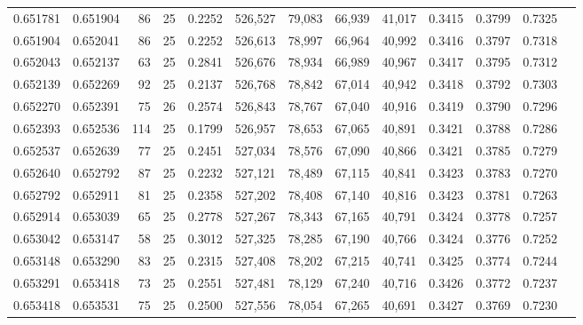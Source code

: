 \begin{tabular}{rrrrrrrrrrrrr}
0.651781 & 0.651904 &    86 &  25 &                                     0.2252 & 526,527 &  79,083 &  66,939 &  41,017 & 0.3415 & 0.3799 & 0.7325 \\
0.651904 & 0.652041 &    86 &  25 &                                     0.2252 & 526,613 &  78,997 &  66,964 &  40,992 & 0.3416 & 0.3797 & 0.7318 \\
0.652043 & 0.652137 &    63 &  25 &                                     0.2841 & 526,676 &  78,934 &  66,989 &  40,967 & 0.3417 & 0.3795 & 0.7312 \\
0.652139 & 0.652269 &    92 &  25 &                                     0.2137 & 526,768 &  78,842 &  67,014 &  40,942 & 0.3418 & 0.3792 & 0.7303 \\
0.652270 & 0.652391 &    75 &  26 &                                     0.2574 & 526,843 &  78,767 &  67,040 &  40,916 & 0.3419 & 0.3790 & 0.7296 \\
0.652393 & 0.652536 &   114 &  25 &                                     0.1799 & 526,957 &  78,653 &  67,065 &  40,891 & 0.3421 & 0.3788 & 0.7286 \\
0.652537 & 0.652639 &    77 &  25 &                                     0.2451 & 527,034 &  78,576 &  67,090 &  40,866 & 0.3421 & 0.3785 & 0.7279 \\
0.652640 & 0.652792 &    87 &  25 &                                     0.2232 & 527,121 &  78,489 &  67,115 &  40,841 & 0.3423 & 0.3783 & 0.7270 \\
0.652792 & 0.652911 &    81 &  25 &                                     0.2358 & 527,202 &  78,408 &  67,140 &  40,816 & 0.3423 & 0.3781 & 0.7263 \\
0.652914 & 0.653039 &    65 &  25 &                                     0.2778 & 527,267 &  78,343 &  67,165 &  40,791 & 0.3424 & 0.3778 & 0.7257 \\
0.653042 & 0.653147 &    58 &  25 &                                     0.3012 & 527,325 &  78,285 &  67,190 &  40,766 & 0.3424 & 0.3776 & 0.7252 \\
0.653148 & 0.653290 &    83 &  25 &                                     0.2315 & 527,408 &  78,202 &  67,215 &  40,741 & 0.3425 & 0.3774 & 0.7244 \\
0.653291 & 0.653418 &    73 &  25 &                                     0.2551 & 527,481 &  78,129 &  67,240 &  40,716 & 0.3426 & 0.3772 & 0.7237 \\
0.653418 & 0.653531 &    75 &  25 &                                     0.2500 & 527,556 &  78,054 &  67,265 &  40,691 & 0.3427 & 0.3769 & 0.7230 \\

\end{tabular}
